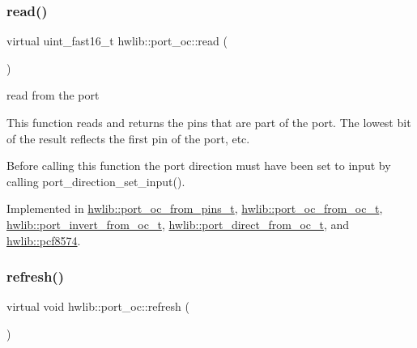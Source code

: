 \mbox{\label{classhwlib_1_1port__oc_a422b02326f14332df44863adced18427}} 
\subsubsection{\texorpdfstring{read()}{read()}}
{\footnotesize\ttfamily virtual uint\+\_\+fast16\+\_\+t hwlib\+::port\+\_\+oc\+::read (\begin{DoxyParamCaption}{ }\end{DoxyParamCaption})\hspace{0.3cm}{\ttfamily [pure virtual]}}





read from the port

This function reads and returns the pins that are part of the port. The lowest bit of the result reflects the first pin of the port, etc.

Before calling this function the port direction must have been set to input by calling port\+\_\+direction\+\_\+set\+\_\+input(). 

Implemented in \hyperlink{classhwlib_1_1port__oc__from__pins__t_a9bd46a2c70ab338350e899b757e6422c}{hwlib\+::port\+\_\+oc\+\_\+from\+\_\+pins\+\_\+t}, \hyperlink{classhwlib_1_1port__oc__from__oc__t_a4b5416b414d012a6b8954ae4924253d3}{hwlib\+::port\+\_\+oc\+\_\+from\+\_\+oc\+\_\+t}, \hyperlink{classhwlib_1_1port__invert__from__oc__t_ab2ad571f994e23b53f86e9655541b10d}{hwlib\+::port\+\_\+invert\+\_\+from\+\_\+oc\+\_\+t}, \hyperlink{classhwlib_1_1port__direct__from__oc__t_a159e337f1ffbf3dc5ffd5173172577b3}{hwlib\+::port\+\_\+direct\+\_\+from\+\_\+oc\+\_\+t}, and \hyperlink{classhwlib_1_1pcf8574_abf68953d24063469d4cbb867f87d3b5d}{hwlib\+::pcf8574}.

\mbox{\label{classhwlib_1_1port__oc_aa4488183f5cf241ba48ad4dd1a89e42a}} 
\subsubsection{\texorpdfstring{refresh()}{refresh()}}
{\footnotesize\ttfamily virtual void hwlib\+::port\+\_\+oc\+::refresh (\begin{DoxyParamCaption}{ }\end{DoxyParamCaption})\hspace{0.3cm}{\ttfamily [pure virtual]}}





